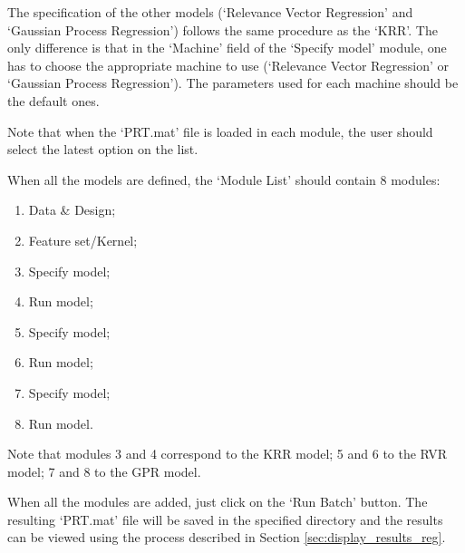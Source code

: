 The specification of the other models (`Relevance Vector Regression' and `Gaussian Process Regression') follows the same procedure as the `KRR'. The only difference is that in the `Machine' field of the `Specify model' module, one has to choose the appropriate machine to use (`Relevance Vector Regression' or `Gaussian Process Regression'). The parameters used for each machine should be the default ones.

Note that when the `PRT.mat' file is loaded in each module, the user should select the latest option on the list.

When all the models are defined, the `Module List' should contain 8 modules:
\begin{enumerate}
    \item Data \& Design;
    \item Feature set/Kernel;
    \item Specify model;
    \item Run model;
    \item Specify model;
    \item Run model;
    \item Specify model;
    \item Run model.
\end{enumerate}

Note that modules 3 and 4 correspond to the KRR model; 5 and 6 to the RVR model; 7 and 8 to the GPR model.

When all the modules are added, just click on the `Run Batch' button. The resulting `PRT.mat' file will be saved in the specified directory and the results can be viewed using the process described in Section \ref{sec:display_results_reg}.
